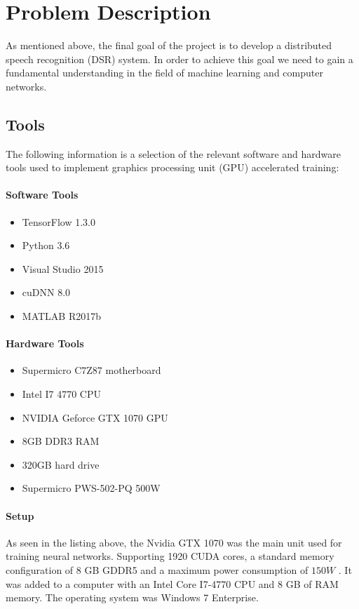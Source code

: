\chapter{Problem Description}\label{ch:problem_description}
As mentioned above, the final goal of the project is to develop a distributed speech recognition (DSR) system.
In order to achieve this goal we need to gain a fundamental understanding in the field of machine learning and computer networks.

\section{Tools}
The following information is a selection of the relevant software and hardware tools used to implement graphics processing unit (GPU) accelerated training:

\subsubsection{Software Tools}
\begin{itemize}
    \item TensorFlow 1.3.0
    \item Python 3.6
    \item Visual Studio 2015
    \item cuDNN 8.0  
    \item MATLAB R2017b
\end{itemize}

\subsubsection{Hardware Tools}
\begin{itemize}
    \item Supermicro C7Z87 motherboard
    \item Intel I7 4770 CPU
    \item NVIDIA Geforce GTX 1070 GPU
    \item 8GB DDR3 RAM
    \item 320GB hard drive
    \item Supermicro PWS-502-PQ 500W
\end{itemize}

\subsubsection{Setup}
As seen in the listing above, the Nvidia GTX 1070 was the main unit used for training neural networks.
Supporting 1920 CUDA cores, a standard memory configuration of 8 GB GDDR5 and a maximum power consumption of $150W$ \cite{GPU}. It was added to a computer with an Intel Core I7-4770 CPU and 8 GB of RAM memory. The operating system was Windows 7 Enterprise.

